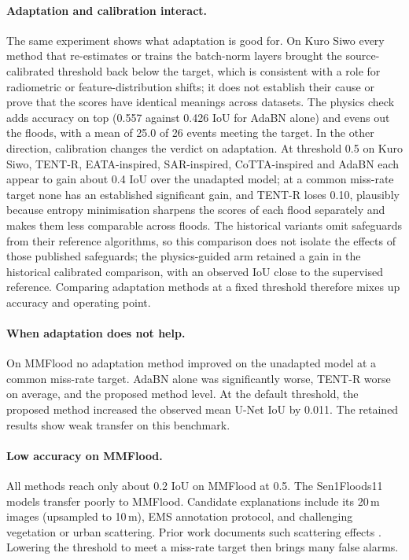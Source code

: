 \paragraph{Adaptation and calibration interact.} The same experiment shows what adaptation is good for. On Kuro Siwo every method that re-estimates or trains the batch-norm layers brought the source-calibrated threshold back below the target, which is consistent with a role for radiometric or feature-distribution shifts; it does not establish their cause or prove that the scores have identical meanings across datasets. The physics check adds accuracy on top (0.557 against 0.426 IoU for AdaBN alone) and evens out the floods, with a mean of 25.0 of 26 events meeting the target. In the other direction, calibration changes the verdict on adaptation. At threshold 0.5 on Kuro Siwo, TENT-R, EATA-inspired, SAR-inspired, CoTTA-inspired and AdaBN each appear to gain about 0.4 IoU over the unadapted model; at a common miss-rate target none has an established significant gain, and TENT-R loses 0.10, plausibly because entropy minimisation sharpens the scores of each flood separately and makes them less comparable across floods. The historical variants omit safeguards from their reference algorithms, so this comparison does not isolate the effects of those published safeguards; the physics-guided arm retained a gain in the historical calibrated comparison, with an observed IoU close to the supervised reference. Comparing adaptation methods at a fixed threshold therefore mixes up accuracy and operating point.

\paragraph{When adaptation does not help.} On MMFlood no adaptation method improved on the unadapted model at a common miss-rate target. AdaBN alone was significantly worse, TENT-R worse on average, and the proposed method level. At the default threshold, the proposed method increased the observed mean U-Net IoU by 0.011. The retained results show weak transfer on this benchmark.

\paragraph{Low accuracy on MMFlood.} All methods reach only about 0.2 IoU on MMFlood at 0.5. The Sen1Floods11 models transfer poorly to MMFlood. Candidate explanations include its 20\,m images (upsampled to 10\,m), EMS annotation protocol, and challenging vegetation or urban scattering. Prior work documents such scattering effects \citep{tsyganskaya2018vegetation,zhao2024urbansarfloods}. Lowering the threshold to meet a miss-rate target then brings many false alarms.

